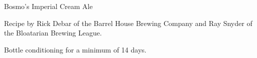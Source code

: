 \begin{recipe}{Bosmo's Imperial Cream Ale} %

\begin{aboutblock}
Recipe by Rick Debar of the Barrel House Brewing Company and Ray Snyder of the
Bloatarian Brewing League.
\end{aboutblock}


\begin{methodandtiming}

\begin{mashsteps}
\end{mashsteps}

\begin{fermentationsteps}
\end{fermentationsteps}

\begin{directions}
Bottle conditioning for a minimum of 14 days.
\end{directions}

\end{methodandtiming}

\recipebreak

\begin{ingredientsblock}

\begin{malts}
\end{malts}

\begin{hops}
\end{hops}


\end{ingredientsblock}

\end{recipe}


